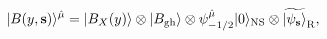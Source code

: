 \begin{equation}
 | B(y,{\bf s}) \rangle^{\hat \mu}
 = | B_X(y) \rangle \otimes | B_{\rm gh} \rangle
 \otimes \psi_{-1/2}^{\hat \mu} | 0 \rangle_{\rm NS}
 \otimes {\widetilde {| {\psi_{\bf s}} \rangle}}_{\rm R},
\end{equation}

